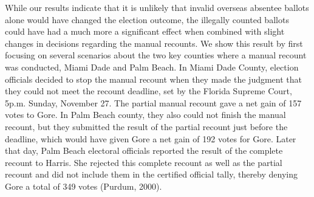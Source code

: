 \documentclass[11pt,titlepage]{article}
\begin{document}
While our results indicate that it is unlikely that invalid overseas
absentee ballots alone would have changed the election outcome, the
illegally counted ballots could have had a much more a significant
effect when combined with slight changes in decisions regarding the
manual recounts.  We show this result by first focusing on several
scenarios about the two key counties where a manual recount was
conducted, Miami Dade and Palm Beach. In Miami Dade County, election
officials decided to stop the manual recount when they made the
judgment that they could not meet the recount deadline, set by the
Florida Supreme Court, 5p.m.  Sunday, November 27.  The partial manual
recount gave a net gain of 157 votes to Gore. In Palm Beach county,
they also could not finish the manual recount, but they submitted the
result of the partial recount just before the deadline, which would
have given Gore a net gain of 192 votes for Gore. Later that day, Palm
Beach electoral officials reported the result of the complete recount
to Harris.  She rejected this complete recount as well as the partial
recount and did not include them in the certified official tally,
thereby denying Gore a total of 349 votes \nocite{purd:00}(Purdum,
2000).
\end{document}
